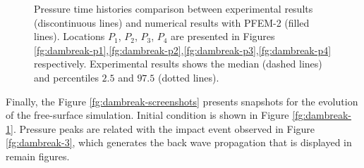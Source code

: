 \begin{figure}[h]
{    }
   \caption{Pressure time histories comparison between experimental results\cite{Lobovsky13} (discontinuous lines) and numerical results with PFEM-2 (filled lines). Locations $P_1$, $P_2$, $P_3$, $P_4$ are presented in Figures \ref{fg:dambreak-p1},\ref{fg:dambreak-p2},\ref{fg:dambreak-p3},\ref{fg:dambreak-p4} respectively. Experimental results shows the median (dashed lines) and percentiles $2.5$ and $97.5$ (dotted lines).}
   \label{fg:dambreak-p}                %
\end{figure}

Finally, the Figure \ref{fg:dambreak-screenshots} presents snapshots for the evolution of the free-surface simulation. Initial condition is shown in Figure \ref{fg:dambreak-1}. Pressure peaks are related with the impact event observed in Figure \ref{fg:dambreak-3}, which generates the back wave propagation that is displayed in remain figures.
